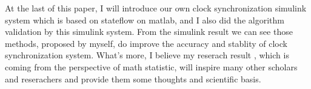 \begin{englishabstract}
At the last of this paper, I will introduce our own clock synchronization simulink system which is based on stateflow on matlab, and I also did the algorithm validation by this simulink system. From the simulink result we can see those methods, proposed by myself, do improve the accuracy and stablity of clock synchronization system. What's more, I believe my reserach result , which is coming from the perspective of math statistic, will inspire many other scholars and reserachers and provide them some thoughts and scientific basis.

\end{englishabstract}

